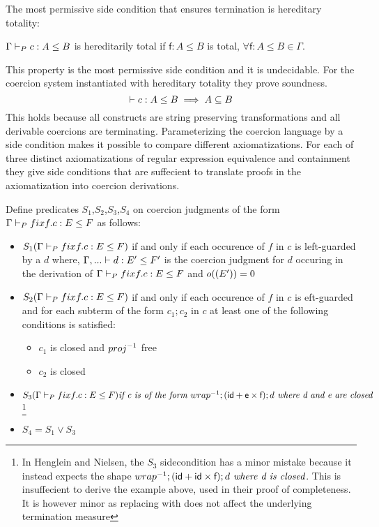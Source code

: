 \documentclass[a4paper,UKenglish,cleveref, autoref, thm-restate]{lipics-v2021}
\begin{document}
The most permissive side condition that ensures termination is hereditary totality:
\begin{definition}
$\containsG{c}{A}{B}$ is hereditarily total if $\mathsf{f}: A \leq B$ is total, $\forall \mathsf{f} : A \leq B \in \Gamma$.
\end{definition}
This property is the most permissive side condition and it is undecidable. For the coercion system instantiated with hereditary totality they prove soundness.
\[ \contains{}{c}{A}{B} \implies A \subseteq B\]
This holds because all constructs are string preserving transformations and all derivable coercions are terminating.
Parameterizing the coercion language by a side condition makes it possible to compare different axiomatizations. For each of three distinct axiomatizations of regular expression equivalence and containment they give side conditions that are suffecient to translate proofs in the axiomatization into coercion derivations.
\begin{definition}
 Define predicates $S_1$,$S_2$,$S_3$,$S_4$ on coercion judgments of the form $\containsG{\fix f. c}{E}{F}$ as follows:
 \begin{itemize}
 \item $S_1(\containsG{\fix f. c}{E}{F})$ if and only if each occurence of $f$ in $c$ is left-guarded by a $d$ where, $\contains{\Gamma ,...}{d}{E'}{F'}$ is the coercion judgment for $d$ occuring in the derivation of $\containsG{\fix f. c}{E}{F}$ and $o((E'))=0$\\
 \item $S_2(\containsG{\fix f. c}{E}{F})$ if and only if each occurence of $f$ in $c$ is eft-guarded and for each subterm of the form $c_1;c_2$ in $c$ at least one of the following conditions is satisfied:
   \begin{itemize}
   \item $c_1$ is closed and $\dslcominv{proj}$ free
     \item $c_2$ is closed
   \end{itemize}
\item $S_3(\containsG{\fix f. c}{E}{F}) \textit{if c is of the form } \dslcominv{wrap};(\dslcom{id}+\dslcom{e} \times \dslcom{f});d \textit{ where d and e are closed}$ \footnote{In Henglein and Nielsen, the $S_3$ sidecondition has a minor mistake because it instead expects the shape $\dslcominv{wrap};(\dslcom{id}+\dslcom{id} \times \dslcom{f});d \textit{ where d is closed}$. This is insuffecient to derive the example above, used in their proof of completeness. It is however minor as replacing  with  does not affect the underlying termination measure}
\item $S_4 = S_1 \lor S_3$
   \end{itemize}
\end{definition}
\end{document}

